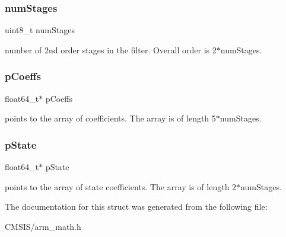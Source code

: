\subsubsection{\texorpdfstring{numStages}{numStages}}
{\footnotesize\ttfamily uint8\+\_\+t num\+Stages}

number of 2nd order stages in the filter. Overall order is 2$\ast$num\+Stages. \mbox{\label{structarm__biquad__cascade__df2_t__instance__f64_a2f5f42f60a50d7cb39837fd9b80cd8f0}} 
\subsubsection{\texorpdfstring{pCoeffs}{pCoeffs}}
{\footnotesize\ttfamily float64\+\_\+t$\ast$ p\+Coeffs}

points to the array of coefficients. The array is of length 5$\ast$num\+Stages. \mbox{\label{structarm__biquad__cascade__df2_t__instance__f64_ae97c926a7e3a4bfe26fcdd0a3cc2f5c6}} 
\subsubsection{\texorpdfstring{pState}{pState}}
{\footnotesize\ttfamily float64\+\_\+t$\ast$ p\+State}

points to the array of state coefficients. The array is of length 2$\ast$num\+Stages. 

The documentation for this struct was generated from the following file\+:\begin{DoxyCompactItemize}
\item 
C\+M\+S\+I\+S/arm\+\_\+math.\+h\end{DoxyCompactItemize}
